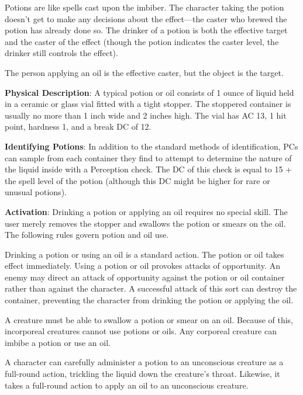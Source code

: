 Potions are like spells cast upon the imbiber. The character taking the potion doesn't get to make any decisions about the effect---the caster who brewed the potion has already done so. The drinker of a potion is both the effective target and the caster of the effect (though the potion indicates the caster level, the drinker still controls the effect).
				
The person applying an oil is the effective caster, but the object is the target.
				
\textbf{Physical Description}: A typical potion or oil consists of 1 ounce of liquid held in a ceramic or glass vial fitted with a tight stopper. The stoppered container is usually no more than 1 inch wide and 2 inches high. The vial has AC 13, 1 hit point, hardness 1, and a break DC of 12. 
				
\textbf{Identifying Potions}: In addition to the standard methods of identification, PCs can sample from each container they find to attempt to determine the nature of the liquid inside with a Perception check. The DC of this check is equal to 15 + the spell level of the potion (although this DC might be higher for rare or unusual potions). 
				
\textbf{Activation}: Drinking a potion or applying an oil requires no special skill. The user merely removes the stopper and swallows the potion or smears on the oil. The following rules govern potion and oil use.
				
Drinking a potion or using an oil is a standard action. The potion or oil takes effect immediately. Using a potion or oil provokes attacks of opportunity. An enemy may direct an attack of opportunity against the potion or oil container rather than against the character. A successful attack of this sort can destroy the container, preventing the character from drinking the potion or applying the oil. 
				
A creature must be able to swallow a potion or smear on an oil. Because of this, incorporeal creatures cannot use potions or oils. Any corporeal creature can imbibe a potion or use an oil.
				
A character can carefully administer a potion to an unconscious creature as a full-round action, trickling the liquid down the creature's throat. Likewise, it takes a full-round action to apply an oil to an unconscious creature.
        	
